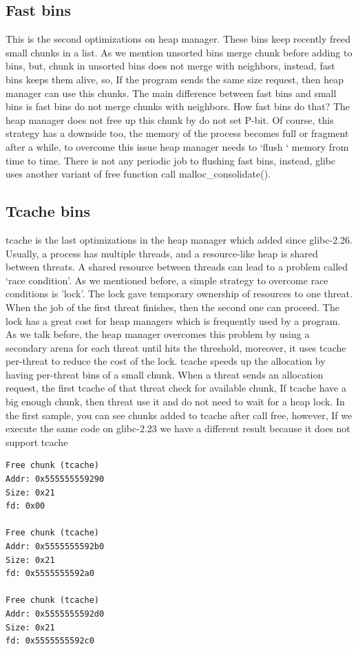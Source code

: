 \documentclass{masterthesis}
\newcommand*\libc{glibc}
\newcommand*\tch{tcache}
\newcommand*\fb{fast bins}
\newcommand*\ub{unsorted bins}
\newcommand*\sbs{small bins}
\newcommand*\Tch{Tcache\xspace}
\newcommand*\Fb{Fast bins\xspace}
\begin{document}
\subsection{\Fb}
This is the second optimizations on heap manager. These bins keep recently freed small chunks in a list. As we mention \ub{} merge chunk before adding to bins, but, chunk in \ub{} does not merge with neighbors, instead, \fb{} keeps them alive, so, If the program sends the same size request, then heap manager can use this chunks.
The main difference between \fb{} and \sbs{} is \fb{} do not merge chunks with neighbors. How \fb{} do that? The heap manager does not free up this chunk by do not set P-bit. Of course, this strategy has a downside too, the memory of the process becomes full or fragment after a while, to overcome this issue heap manager needs to ‘flush ‘ memory from time to time. There is not any periodic job to flushing \fb{}, instead, \libc{} uses another variant of free function call malloc\_consolidate(). 

\subsection{\Tch bins}
\tch{} is the last optimizations in the heap manager which added since \libc{-2.26}. Usually, a process has multiple threads, and a resource-like heap is shared between threats. A shared resource between threads can lead to a problem called ‘race condition’. As we mentioned before, a simple strategy to overcome race conditions is 'lock'. The lock gave temporary ownership of resources to one threat. When the job of the first threat finishes, then the second one can proceed. The lock has a great cost for heap managers which is frequently used by a program. As we talk before, the heap manager overcomes this problem by using a secondary arena for each threat until hits the threshold, moreover, it uses \tch{} per-threat to reduce the cost of the lock. \tch{} speeds up the allocation by having per-threat bins of a small chunk. When a threat sends an allocation request, the first \tch{} of that threat check for available chunk, If \tch{} have a big enough chunk, then threat use it and do not need to wait for a heap lock. In the first sample, you can see chunks added to \tch{} after call free, however, If we execute the same code on \libc{-2.23} we have a different result because it does not support \tch{}

\begin{lstlisting}[frame=tlrb]
Free chunk (tcache) 
Addr: 0x555555559290
Size: 0x21
fd: 0x00

Free chunk (tcache) 
Addr: 0x5555555592b0
Size: 0x21
fd: 0x5555555592a0

Free chunk (tcache) 
Addr: 0x5555555592d0
Size: 0x21
fd: 0x5555555592c0
\end{lstlisting}
\end{document}
